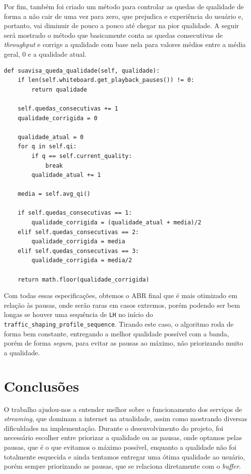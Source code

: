 \documentclass[12pt]{article}
\begin{document}
Por fim, também foi criado um método para controlar as quedas de qualidade de forma a não cair de uma vez para zero, que prejudica e experiência do usuário e, portanto, vai diminuir de pouco a pouco até chegar na pior qualidade. A seguir será mostrado o método que basicamente conta as quedas consecutivas de \textit{throughput} e corrige a qualidade com base nela para valores médios entre a média geral, 0 e a qualidade atual.

\begin{lstlisting}
def suavisa_queda_qualidade(self, qualidade):
    if len(self.whiteboard.get_playback_pauses()) != 0:
        return qualidade

    self.quedas_consecutivas += 1
    qualidade_corrigida = 0

    qualidade_atual = 0
    for q in self.qi:
        if q == self.current_quality:
            break
        qualidade_atual += 1

    media = self.avg_qi()

    if self.quedas_consecutivas == 1:
        qualidade_corrigida = (qualidade_atual + media)/2
    elif self.quedas_consecutivas == 2:
        qualidade_corrigida = media
    elif self.quedas_consecutivas == 3:
        qualidade_corrigida = media/2

    return math.floor(qualidade_corrigida)
\end{lstlisting}

Com todas essas especificações, obtemos o ABR final que é mais otimizado em relação às pausas, onde serão raras em casos extremos, porém podendo ser bem longas se houver uma sequência de \texttt{LH} no início do \texttt{traffic\_shaping\_profile\_sequence}. Tirando este caso, o algoritmo roda de forma bem constante, entregando a melhor qualidade possível com a banda, porém de forma \textit{segura}, para evitar as pausas ao máximo, não priorizando muito a qualidade.

\section{Conclusões}
O trabalho ajudou-nos a entender melhor sobre o funcionamento dos serviços de \textit{streaming}, que dominam a internet na atualidade, assim como mostrando diversas dificuldades na implementação. Durante o desenvolvimento do projeto, foi necessário escolher entre priorizar a qualidade ou as pausas, onde optamos pelas pausas, que é o que evitamos o máximo possível, enquanto a qualidade não foi totalmente esquecida e ainda tentamos entregar uma ótima qualidade ao usuário, porém sempre priorizando as pausas, que se relaciona diretamente com o \textit{buffer}.
\end{document}

